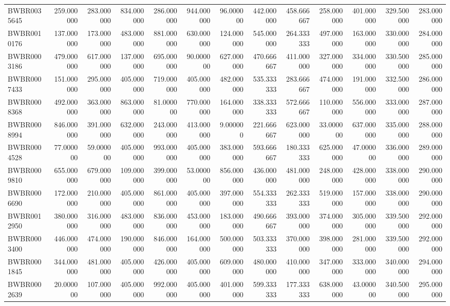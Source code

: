 \begin{longtable}{lrrrrrrrrrrrr}
BWBR0035645 & 259.000000 & 283.000000 & 834.000000 & 286.000000 & 944.000000 & 96.000000 & 442.000000 & 458.666667 & 258.000000 & 401.000000 & 329.500000 & 283.000000 \\
BWBR0010176 & 137.000000 & 173.000000 & 483.000000 & 881.000000 & 630.000000 & 124.000000 & 545.000000 & 264.333333 & 497.000000 & 163.000000 & 330.000000 & 284.000000 \\
BWBR0003186 & 479.000000 & 617.000000 & 137.000000 & 695.000000 & 90.000000 & 627.000000 & 470.666667 & 411.000000 & 327.000000 & 334.000000 & 330.500000 & 285.000000 \\
BWBR0007433 & 151.000000 & 295.000000 & 405.000000 & 719.000000 & 405.000000 & 482.000000 & 535.333333 & 283.666667 & 474.000000 & 191.000000 & 332.500000 & 286.000000 \\
BWBR0008368 & 492.000000 & 363.000000 & 863.000000 & 81.000000 & 770.000000 & 164.000000 & 338.333333 & 572.666667 & 110.000000 & 556.000000 & 333.000000 & 287.000000 \\
BWBR0008994 & 846.000000 & 391.000000 & 632.000000 & 243.000000 & 413.000000 & 9.000000 & 221.666667 & 623.000000 & 33.000000 & 637.000000 & 335.000000 & 288.000000 \\
BWBR0004528 & 77.000000 & 59.000000 & 405.000000 & 993.000000 & 405.000000 & 383.000000 & 593.666667 & 180.333333 & 625.000000 & 47.000000 & 336.000000 & 289.000000 \\
BWBR0009810 & 655.000000 & 679.000000 & 109.000000 & 399.000000 & 53.000000 & 856.000000 & 436.000000 & 481.000000 & 248.000000 & 428.000000 & 338.000000 & 290.000000 \\
BWBR0006690 & 172.000000 & 210.000000 & 405.000000 & 861.000000 & 405.000000 & 397.000000 & 554.333333 & 262.333333 & 519.000000 & 157.000000 & 338.000000 & 290.000000 \\
BWBR0012950 & 380.000000 & 316.000000 & 483.000000 & 836.000000 & 453.000000 & 183.000000 & 490.666667 & 393.000000 & 374.000000 & 305.000000 & 339.500000 & 292.000000 \\
BWBR0003400 & 446.000000 & 474.000000 & 190.000000 & 846.000000 & 164.000000 & 500.000000 & 503.333333 & 370.000000 & 398.000000 & 281.000000 & 339.500000 & 292.000000 \\
BWBR0001845 & 344.000000 & 481.000000 & 405.000000 & 426.000000 & 405.000000 & 609.000000 & 480.000000 & 410.000000 & 347.000000 & 333.000000 & 340.000000 & 294.000000 \\
BWBR0002639 & 20.000000 & 107.000000 & 405.000000 & 992.000000 & 405.000000 & 401.000000 & 599.333333 & 177.333333 & 638.000000 & 43.000000 & 340.500000 & 295.000000 \\

\end{longtable}
